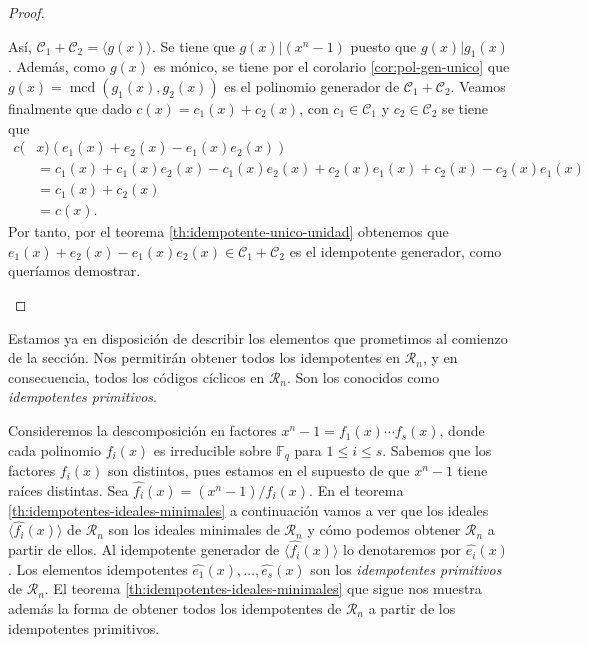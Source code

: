 \begin{proof}
\begin{enumerate}
    Así, \(\mathcal C_1 + \mathcal C_2 = \langle g(x) \rangle\).
    Se tiene que \(g(x) | (x^n - 1)\) puesto que \(g(x) | g_1(x)\).
    Además, como \(g(x)\) es mónico, se tiene por el corolario \ref{cor:pol-gen-unico} que \(g(x) = \operatorname{mcd}(g_1(x), g_2(x))\) es el polinomio generador de \(\mathcal C_1 + \mathcal C_2\).
    Veamos finalmente que dado \(c(x) = c_1(x) + c_2(x)\), con \(c_1 \in \mathcal C_1\) y \(c_2 \in \mathcal C_2\) se tiene que 
    \begin{align*}
      c(&x)(e_1(x) + e_2(x) - e_1(x)e_2(x))\\
      &= c_1(x) + c_1(x)e_2(x) - c_1(x)e_2(x) + c_2(x)e_1(x) + c_2(x) - c_2(x)e_1(x)\\
      &=  c_1(x) + c_2(x)\\
      &= c(x).
    \end{align*}
    Por tanto, por el teorema \ref{th:idempotente-unico-unidad} obtenemos que \(e_1(x) + e_2(x) - e_1(x)e_2(x) \in \mathcal C_1 + \mathcal C_2\) es el idempotente generador, como queríamos demostrar.\qedhere
  \end{enumerate}
\end{proof}

Estamos ya en disposición de describir los elementos que prometimos al comienzo de la sección.
Nos permitirán obtener todos los idempotentes en \(\mathcal R_n\), y en consecuencia, todos los códigos cíclicos en \(\mathcal R_n\).
Son los conocidos como \emph{idempotentes primitivos}.

Consideremos la descomposición en factores \(x^n - 1 = f_1(x)\cdots f_s(x)\), donde cada polinomio \(f_i(x)\) es irreducible sobre \(\mathbb F_q\) para \(1 \leq i \leq s\).
Sabemos que los factores \(f_i(x)\) son distintos, pues estamos en el supuesto de que \(x^n - 1\) tiene raíces distintas.
Sea \(\widehat{f_i}(x) = (x^n - 1)/f_i(x)\).
En el teorema \ref{th:idempotentes-ideales-minimales} a continuación vamos a ver que los ideales \(\langle \widehat{f_i}(x)\rangle\) de \(\mathcal R_n\) son los ideales minimales de \(\mathcal R_n\) y cómo podemos obtener \(\mathcal R_n\) a partir de ellos.
Al idempotente generador de \(\langle \widehat{f_i}(x)\rangle\) lo denotaremos por \(\widehat{e_i}(x)\).
Los elementos idempotentes \(\widehat{e_1}(x), \dots, \widehat{e_s}(x)\) son los \emph{idempotentes primitivos} de \(\mathcal R_n\).
El teorema \ref{th:idempotentes-ideales-minimales} que sigue nos muestra además la forma de obtener todos los idempotentes de \(\mathcal R_n\) a partir de los idempotentes primitivos.


